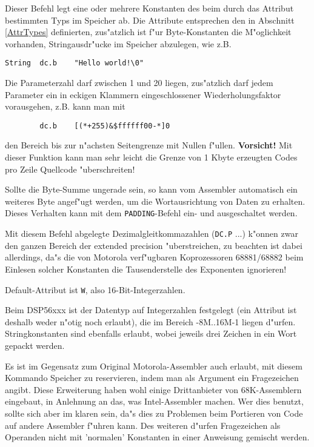 \documentclass[12pt,a4paper,twoside]{report}
\newcommand{\bb}[1]{{\bf #1}}
\newcommand{\tty}[1]{{\tt #1}}
\begin{document}
Dieser Befehl legt eine oder mehrere Konstanten des beim durch
das Attribut bestimmten Typs im Speicher ab.  Die Attribute entsprechen
den in Abschnitt \ref{AttrTypes} definierten, zus"atzlich ist f"ur
Byte-Konstanten die M"oglichkeit vorhanden, Stringausdr"ucke im Speicher
abzulegen, wie z.B.
\begin{verbatim}
String  dc.b    "Hello world!\0"
\end{verbatim}
Die Parameterzahl darf zwischen 1 und 20 liegen, zus"atzlich darf jedem
Parameter ein in eckigen Klammern eingeschlossener Wiederholungsfaktor
vorausgehen, z.B. kann man mit
\begin{verbatim}
        dc.b    [(*+255)&$ffffff00-*]0
\end{verbatim}
den Bereich bis zur n"achsten Seitengrenze mit Nullen f"ullen.
\bb{Vorsicht!}
Mit dieser Funktion kann man sehr leicht die Grenze von 1 Kbyte erzeugten
Codes pro Zeile Quellcode "uberschreiten!
\par
Sollte die Byte-Summe ungerade sein, so kann vom Assembler automatisch
ein weiteres Byte angef"ugt werden, um die Wortausrichtung von Daten zu
erhalten.  Dieses Verhalten kann mit dem \tty{PADDING}-Befehl ein-
und ausgeschaltet werden.
\par
Mit diesem Befehl abgelegte Dezimalgleitkommazahlen (\tty{DC.P} ...) k"onnen
zwar den ganzen Bereich der extended precision "uberstreichen, zu beachten
ist dabei allerdings, da"s die von Motorola verf"ugbaren Koprozessoren
68881/68882 beim Einlesen solcher Konstanten die Tausenderstelle des
Exponenten ignorieren!
\par
Default-Attribut ist \tty{W}, also 16-Bit-Integerzahlen.
\par
Beim DSP56xxx ist der Datentyp auf Integerzahlen festgelegt (ein
Attribut ist deshalb weder n"otig noch erlaubt), die im Bereich
-8M..16M-1 liegen d"urfen.   Stringkonstanten sind ebenfalls erlaubt,
wobei jeweils drei Zeichen in ein Wort gepackt werden.
\par
Es ist im Gegensatz zum Original Motorola-Assembler auch erlaubt, mit
diesem Kommando Speicher zu reservieren, indem man als Argument ein
Fragezeichen angibt.  Diese Erweiterung haben wohl einige Drittanbieter
von 68K-Assemblern eingebaut, in Anlehnung an das, was Intel-Assembler
machen.  Wer dies benutzt, sollte sich aber im klaren sein, da"s dies
zu Problemen beim Portieren von Code auf andere Assembler f"uhren kann.
Des weiteren d"urfen Fragezeichen als Operanden nicht mit 'normalen'
Konstanten in einer Anweisung gemischt werden.
\end{document}

